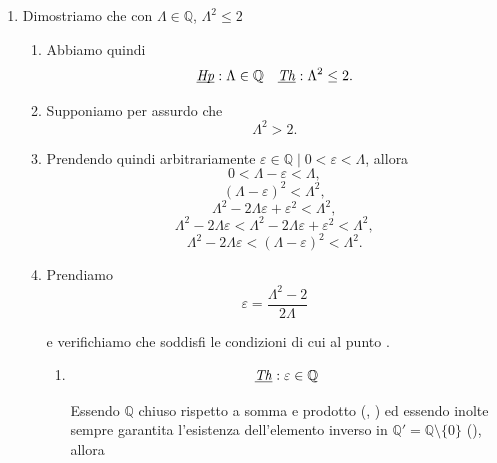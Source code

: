 \begin{enumerate}
\begin{demonstration}
\begin{enumerate}[label=(\roman*)]
\begin{enumerate}[label=\arabic*.]
            \end{enumerate}
            \qed

            \item \label{pas:due-upp-bou} Dimostriamo che con $\Lambda\in\mathbb{Q}$, $\Lambda^2 \leq 2$

            \begin{enumerate}[label=\arabic*.]
                \item Abbiamo quindi
                \[ \underbar{\textit{Hp}}: \Lambda\in\mathbb{Q} \quad \underbar{\textit{Th}}: \Lambda^2 \leq 2.\]

                \item \label{pass:ass-lam-mag} Supponiamo per assurdo che
                \[ \Lambda^2 > 2.\]

                \item \label{pas:con-eps/2}Prendendo quindi arbitrariamente $\varepsilon\in\mathbb{Q} \mid 0 < \varepsilon < \Lambda$, allora
                \[
                    0 < \Lambda - \varepsilon < \Lambda,\]\[
                    \left(\Lambda - \varepsilon\right)^2 < \Lambda^2, \]\[
                    \Lambda^2 -2\Lambda\varepsilon + \varepsilon^2 < \Lambda^2, \]\[
                    \Lambda^2 - 2\Lambda\varepsilon  < \Lambda^2 - 2\Lambda\varepsilon + \varepsilon^2 < \Lambda^2, \]\[
                    \Lambda^2 - 2\Lambda\varepsilon  < \left(\Lambda - \varepsilon\right)^2  < \Lambda^2.
                \]

                \item Prendiamo
                \[ \varepsilon = \frac{\Lambda^2-2}{2\Lambda} \]

                e verifichiamo che soddisfi le condizioni di cui al punto  .

                \begin{enumerate}[label=\arabic{enumiii}.\arabic*.]
                    \item
                    
                    \[ \underbar{\textit{Th}}: \varepsilon\in\mathbb{Q}\]

                    Essendo $\mathbb{Q}$ chiuso rispetto a somma e prodotto (,
                    ) ed essendo inolte sempre garantita l'esistenza dell'elemento inverso
                    in $\mathbb{Q}' = \mathbb{Q} \setminus \{0\}$ (), allora


\end{enumerate}
\end{enumerate}
\end{enumerate}
\end{demonstration}
\end{enumerate}
